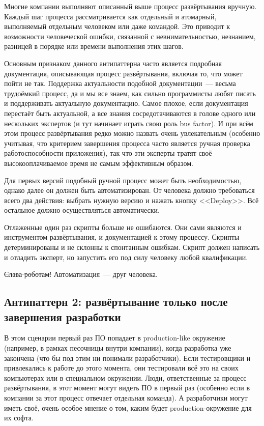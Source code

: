 \documentclass{../../text-style}
\begin{document}
Многие компании выполняют описанный выше процесс развёртывания вручную. Каждый шаг процесса рассматривается как отдельный и атомарный, выполняемый отдельным человеком или даже командой. Это приводит к возможности человеческой ошибки, связанной с невнимательностью, незнанием, разницей в порядке или времени выполнения этих шагов.

Основным признаком данного антипаттерна часто является подробная документация, описывающая процесс развёртывания, включая то, что может пойти не так. Поддержка актуальности подобной документации~--- весьма трудоёмкий процесс, да и мы все знаем, как сильно программисты любят писать и поддерживать актуальную документацию. Самое плохое, если документация перестаёт быть актуальной, а все знания сосредотачиваются в голове одного или нескольких экспертов (и тут начинает играть свою роль bus factor). И при всём этом процесс развёртывания редко можно назвать очень увлекательным (особенно учитывая, что критерием завершения процесса часто является ручная проверка работоспособности приложения), так что эти эксперты тратят своё высокооплачиваемое время не самым эффективным образом.

Для первых версий подобный ручной процесс может быть необходимостью, однако далее он должен быть автоматизирован. От человека должно требоваться всего два действия: выбрать нужную версию и нажать кнопку <<Deploy>>. Всё остальное должно осуществляться автоматически.

Отлаженные один раз скрипты больше не ошибаются. Они сами являются и инструментом развёртывания, и документацией к этому процессу. Скрипты детерминированы и не склонны к спонтанным ошибкам. Скрипт должен написать и отладить эксперт, но запустить его под силу человеку любой квалификации.

\sout{Слава роботам!} Автоматизация~--- друг человека.

\subsection{Антипаттерн 2: развёртывание только после завершения разработки}

В этом сценарии первый раз ПО попадает в production-like окружение (например, в рамках песочницы внутри компании), когда разработка уже закончена (что бы под этим ни понимали разработчики). Если тестировщики и привлекались к работе до этого момента, они тестировали всё это на своих компьютерах или в специальном окружении. Люди, ответственные за процесс развёртывания, в этот момент могут видеть ПО в первый раз (особенно если в компании за этот процесс отвечает отдельная команда). А разработчики могут иметь своё, очень особое мнение о том, каким будет production-окружение для их софта.
\end{document}
